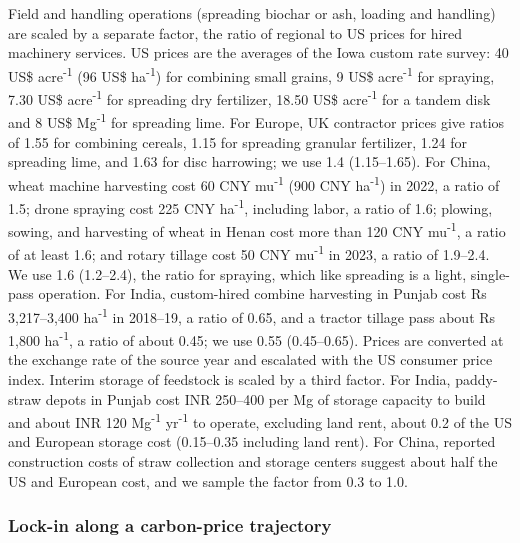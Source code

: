 \documentclass[
  letterpaper,
  twoside,
  twocolumn,
  9pt]{article}
\begin{document}
Field and handling operations (spreading biochar or ash, loading and
handling) are scaled by a separate factor, the ratio of regional to US
prices for hired machinery services. US prices are the averages of the
Iowa custom rate survey:\citep{iowa2025custom} 40 US\$
acre\textsuperscript{-1} (96 US\$ ha\textsuperscript{-1}) for combining
small grains, 9 US\$ acre\textsuperscript{-1} for spraying, 7.30 US\$
acre\textsuperscript{-1} for spreading dry fertilizer, 18.50 US\$
acre\textsuperscript{-1} for a tandem disk and 8 US\$
Mg\textsuperscript{-1} for spreading lime. For Europe, UK contractor
prices \citep{naac2024} give ratios of 1.55 for combining cereals, 1.15
for spreading granular fertilizer, 1.24 for spreading lime, and 1.63 for
disc harrowing; we use 1.4 (1.15--1.65). For China, wheat machine
harvesting cost 60 CNY mu\textsuperscript{-1} (900 CNY
ha\textsuperscript{-1}) in 2022,\citep{mara2022summer} a ratio of 1.5;
drone spraying cost 225 CNY ha\textsuperscript{-1}, including
labor,\citep{wang2022uav} a ratio of 1.6; plowing, sowing, and
harvesting of wheat in Henan cost more than 120 CNY
mu\textsuperscript{-1},\citep{qiu2021ams} a ratio of at least 1.6; and
rotary tillage cost 50 CNY mu\textsuperscript{-1} in
2023,\citep{mara2023spring} a ratio of 1.9--2.4. We use 1.6 (1.2--2.4),
the ratio for spraying, which like spreading is a light, single-pass
operation. For India, custom-hired combine harvesting in Punjab cost Rs
3,217--3,400 ha\textsuperscript{-1} in 2018--19,\citep{anchala2020} a
ratio of 0.65, and a tractor tillage pass about Rs 1,800
ha\textsuperscript{-1}, a ratio of about 0.45; we use 0.55 (0.45--0.65).
Prices are converted at the exchange rate of the source year and
escalated with the US consumer price index. Interim storage of feedstock
is scaled by a third factor. For India, paddy-straw depots in Punjab
cost INR 250--400 per Mg of storage capacity to build and about INR 120
Mg\textsuperscript{-1} yr\textsuperscript{-1} to operate, excluding land
rent,\citep{saboo2025ceew} about 0.2 of the US and European storage cost
(0.15--0.35 including land rent). For China, reported construction costs
of straw collection and storage centers suggest about half the US and
European cost, and we sample the factor from 0.3 to 1.0.

\subsubsection{Lock-in along a carbon-price
trajectory}\label{lock-in-along-a-carbon-price-trajectory}
\end{document}
